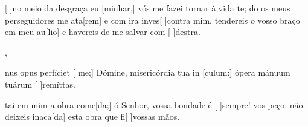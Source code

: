 {    {\item {}[ ]{no} meio da desgraça eu [minhar,] vós me fazei tornar à vida te; do os meus perseguidores me ata[rem] e com ira inves[ ]{con}tra mim, tendereis o vosso braço em meu au[lio] e havereis de me salvar com [ ]{des}tra.~\Antiphona},
  {\item {}nus opus perfíciet [ me;] Dómine, misericórdia tua in [culum:] ópera mánuum tuárum [ ]{re}{mít}tas.~\Antiphona}%
    {\item {}tai em mim a obra come[da;] ó Senhor, vossa bondade é [ ]{sem}pre!  vos peço: não deixeis inaca[da] esta obra que fi[ ]{vos}sas mãos.~\Antiphona}
}